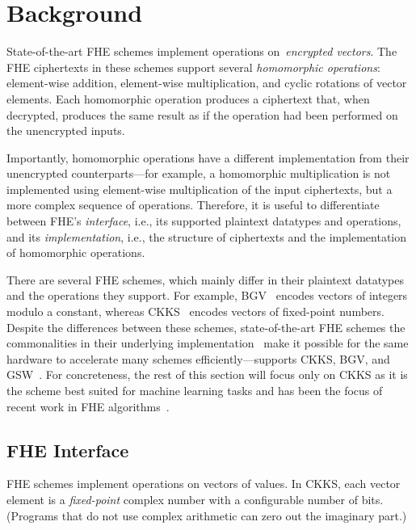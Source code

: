 \chapter{Background}\label{sec:background}

State-of-the-art FHE schemes implement operations on~\emph{encrypted vectors}.
The FHE ciphertexts in these schemes support several \emph{homomorphic
operations}: element-wise addition, element-wise multiplication, and cyclic
rotations of vector elements. Each homomorphic operation produces a ciphertext
that, when decrypted, produces the same result as if the operation had been
performed on the unencrypted inputs.

Importantly, homomorphic operations have a different implementation from their
unencrypted counterparts---for example, a homomorphic multiplication is not
implemented using element-wise multiplication of the input ciphertexts, but a
more complex sequence of operations. Therefore, it is useful to differentiate
between FHE's \emph{interface}, i.e., its supported plaintext datatypes and
operations, and its \emph{implementation}, i.e., the structure of ciphertexts
and the implementation of homomorphic operations.

There are several FHE schemes, which mainly differ in their plaintext datatypes
and the operations they support. For example,
BGV~\cite{brakerski:toct14:leveled} encodes vectors of integers modulo a
constant, whereas CKKS~\cite{cheon:ictaci17:homomorphic} encodes vectors of
fixed-point numbers. Despite the differences between these schemes, %
state-of-the-art FHE schemes the commonalities in their underlying
implementation~\cite{lyubashevsky:tact10:ideal} make it possible for the same
hardware to accelerate many schemes efficiently---\name supports CKKS, BGV, and
GSW~\cite{gentry:crypto13:homomorphic}. For concreteness, the rest of this
section will focus only on CKKS as it is the scheme best suited for machine
learning tasks and has been the focus of recent work in FHE
algorithms~\cite{han:iacr18:efficient,lee:2021:privacy,gilad:icml16:cryptonets,podschwadt:2020:classification,dathathri:pldi19:chet,dathathri:pldi20:eva}.

\section{FHE Interface}
\label{sec:fhe_mapping}

FHE schemes implement operations on vectors of values. In CKKS, each vector
element is a \emph{fixed-point} complex number with a configurable number of
bits. (Programs that do not use complex arithmetic can zero out the imaginary
part.)

